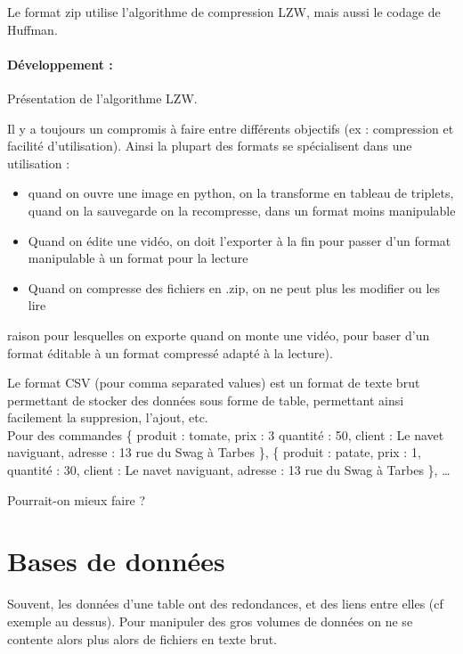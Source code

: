 \begin{rem}
	Le format zip utilise l'algorithme de compression LZW, mais aussi le codage de Huffman.
\end{rem}

\paragraph{Développement :} Présentation de l'algorithme LZW.

\begin{rem}
	Il y a toujours un compromis à faire entre différents objectifs (ex : compression et facilité d'utilisation). Ainsi la plupart des formats se spécialisent dans une utilisation :
	\begin{itemize}
		\item quand on ouvre une image en python, on la transforme en tableau de triplets, quand on la sauvegarde on la recompresse, dans un format moins manipulable
		\item Quand on édite une vidéo, on doit l'exporter à la fin pour passer d'un format manipulable à un format pour la lecture
		\item Quand on compresse des fichiers en .zip, on ne peut plus les modifier ou les lire 
	\end{itemize}raison pour lesquelles on exporte quand on monte une vidéo, pour baser d'un format éditable à un format compressé adapté à la lecture).
\end{rem}

\begin{example}
	Le format CSV (pour comma separated values) est un format de texte brut permettant de stocker des données sous forme de table, permettant ainsi facilement la suppresion, l'ajout, etc.\\
	
	Pour des commandes \{ produit : tomate, prix : 3 quantité : 50, client : Le navet naviguant, adresse : 13 rue du Swag à Tarbes \},  \{ produit : patate, prix : 1, quantité : 30, client : Le navet naviguant, adresse : 13 rue du Swag à Tarbes \},  \dots
	
	Pourrait-on mieux faire ?
\end{example}

\section{Bases de données}

Souvent, les données d'une table ont des redondances, et des liens entre elles (cf exemple au dessus). Pour manipuler des gros volumes de données on ne se contente alors plus alors de fichiers en texte brut.

